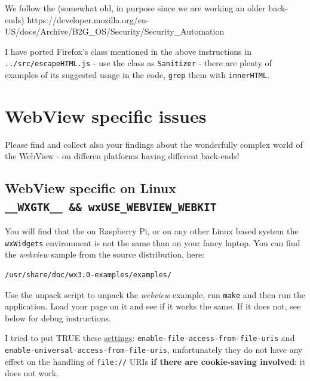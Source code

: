 \documentclass[11pt]{article}
\begin{document}
    We follow the (somewhat old, in purpose since we are working an older
back-ends)
https://developer.mozilla.org/en-US/docs/Archive/B2G\_OS/Security/Security\_Automation

    I have ported Firefox's class mentioned in the above instructions in
\texttt{../src/escapeHTML.js} - use the class as \texttt{Sanitizer} -
there are plenty of examples of its suggested usage in the code,
\texttt{grep} them with \texttt{innerHTML}.

    \hypertarget{webview-specific-issues}{%
\section{WebView specific issues}\label{webview-specific-issues}}

    Please find and collect also your findings about the wonderfully complex
world of the WebView - on differen platforms having different back-ends!

    \hypertarget{webview-specific-on-linux-__wxgtk__-wxuse_webview_webkit}{%
\subsection{\texorpdfstring{WebView specific on Linux
\texttt{\_\_WXGTK\_\_\ \&\&\ wxUSE\_WEBVIEW\_WEBKIT}}{WebView specific on Linux \_\_WXGTK\_\_ \&\& wxUSE\_WEBVIEW\_WEBKIT}}\label{webview-specific-on-linux-__wxgtk__-wxuse_webview_webkit}}

    You will find that the on Raspberry Pi, or on any other Linux based
system the \texttt{wxWidgets} environment is not the same than on your
fancy laptop. You can find the \emph{webview} sample from the source
distribution, here:

\begin{verbatim}
/usr/share/doc/wx3.0-examples/examples/
\end{verbatim}

Use the unpack script to unpack the \emph{webview} example, run
\texttt{make} and then run the application. Load your page on it and see
if it works the same. If it does not, see below for debug instructions.

    I tried to put TRUE these
\href{https://webkitgtk.org/reference/webkitgtk/2.4.10/webkitgtk-webkitwebview.html}{settings}:
\texttt{enable-file-access-from-file-uris} and
\texttt{enable-universal-access-from-file-uris}, unfortunately they do
not have any effect on the handling of \texttt{file://} URIs \textbf{if
there are cookie-saving involved}: it does not work.
\end{document}
